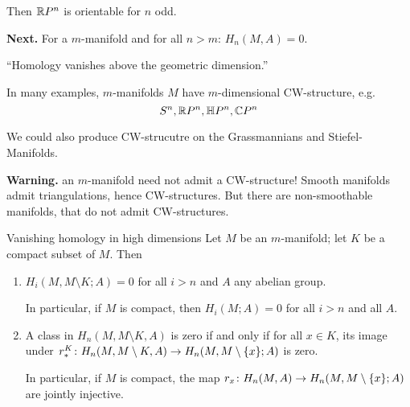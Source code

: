 \documentclass[language=english]{TemplateLecture}
\begin{document}
 Then \(\mathbb{R} P^n\) is orientable for \(n\) odd.

\textbf{Next.} For a \(m\)-manifold and for all \(n > m\): \(H_n(M,A) = 0\).

\enquote{Homology vanishes above the geometric dimension.}

In many examples, \(m\)-manifolds \(M\) have \(m\)-dimensional CW-structure, e.g.
\[S^n, \mathbb{R} P^n, \mathbb{H} P^n, \mathbb{C} P^n\]

We could also produce CW-strucutre on the Grassmannians and Stiefel-Manifolds.

\textbf{Warning.} an \(m\)-manifold need not admit a CW-structure! Smooth manifolds admit triangulations, hence CW-structures. But there are non-smoothable manifolds, that do not admit CW-structures.

\begin{thm}{Vanishing homology in high dimensions}{}
    Let \(M\) be an \(m\)-manifold; let \(K\) be a compact subset of \(M\). Then
    \begin{enumerate}
        \item \(H_i(M, M\setminus K; A) = 0\) for all \(i > n\) and \(A\) any abelian group.
        
        In particular, if \(M\) is compact, then \(H_i(M; A) = 0\) for all \(i > n\) and all \(A\).
        \item A class in \(H_n(M, M\setminus K, A)\) is zero if and only if for all \(x \in K\), its image under \(r_*^K\colon H_n(M, M\setminus K, A) \to H_n(M, M\setminus \{x\}; A)\) is zero.
        
        In particular, if \(M\) is compact, the map \(r_x\colon H_n(M,A) \to H_n(M, M \setminus \{x\}; A)\) are jointly injective.
    \end{enumerate}
\end{thm}
\end{document}
